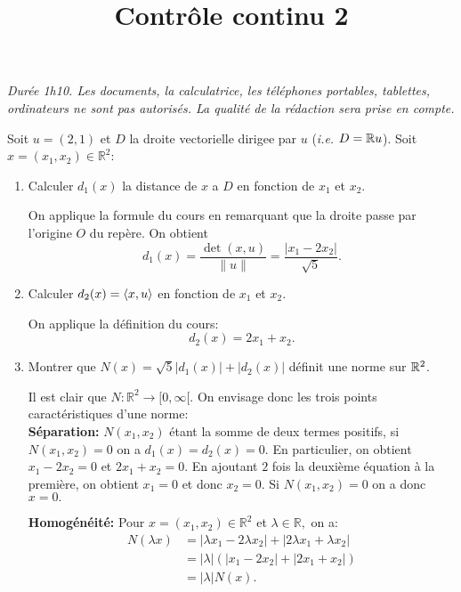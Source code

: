 \documentclass[a4paper]{tp_um}
\title{\large \sffamily\bfseries Contrôle continu 2}
\begin{document}
\maketitle
\textit{Durée 1h10. Les documents, la calculatrice, les téléphones portables, tablettes, ordinateurs ne sont pas autorisés. La qualité de la rédaction sera prise en compte.} 

\bigskip
\bigskip

\exo{} Soit $u = (2,1)$ et $D$ la droite vectorielle dirigee par $u$ (\textit{i.e.} $D = \mathbb{R} u$). Soit $x = (x_1,x_2) \in \mathbb R^2$:

\begin{enumerate}
    \item Calculer $d_1(x)$ la distance de $x$ a $D$ en fonction de $x_1$ et $x_2$.

	\bigskip

        On applique la formule du cours en remarquant que la droite passe par l'origine $O$ du rep\`ere. On obtient  
        \[
        d_1(x) =  \dfrac{\det({x},u)}{\|u\|} = \dfrac{|x_1-2x_2|}{\sqrt{5}}.
        \]
      
\medskip
        
    \item Calculer $d_2(x) = \left\langle x,u\right\rangle$ en fonction de $x_1$ et $x_2$.

	\bigskip

	On applique la d\'efinition du cours:
	\[
	d_2(x) = 2x_1+x_2.
	\]
	
	\medskip
	

    \item Montrer que $N(x) = \sqrt{5}|d_1(x)| + |d_2(x)| $ définit une norme sur $\mathbb{R}^2$.

	\bigskip

	Il est clair que $N:\mathbb R^2 \to [0,\infty[.$ On envisage donc les trois points caract\'eristiques d'une norme: \\
	{\bf S\'eparation:} $N(x_1,x_2)$ \'etant la somme de deux termes positifs, si $N(x_1,x_2)=0$ on a $d_1(x) = d_2(x) =0.$ En particulier, on obtient $x_1-2x_2 = 0$ et $2x_1+x_2=0.$ En ajoutant $2$ fois la deuxi\`eme \'equation \`a la premi\`ere, on obtient $x_1=0$ et donc $x_2=0.$ Si $N(x_1,x_2)= 0$ on a donc $x =0.$
	
	{\bf Homog\'en\'eit\'e:} Pour $x=(x_1,x_2) \in \mathbb R^2$ et $\lambda \in \mathbb R,$ on a:
	\begin{align*}
	N(\lambda x) & = |\lambda x_1-2\lambda x_2| + |2\lambda x_1 + \lambda x_2| \\
						& = |\lambda| \left(  |x_1-2x_2| + |2x_1 + x_2| \right) \\
						& = |\lambda| N(x).
	\end{align*}
 	

\end{enumerate}
\end{document}
